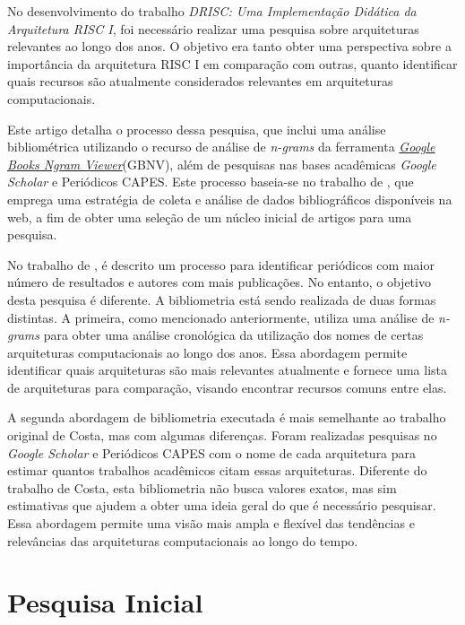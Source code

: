 \documentclass[
	article,			%
	11pt,				%
	oneside,			%
	a4paper,			%
	english,			%
	brazil,				%
	sumario=tradicional
	]{abntex2}
\begin{document}
No desenvolvimento do trabalho \textit{DRISC: Uma Implementação Didática da Arquitetura RISC I}, foi necessário realizar uma pesquisa sobre arquiteturas relevantes ao longo dos anos. O objetivo era tanto obter uma perspectiva sobre a importância da arquitetura RISC I em comparação com outras, quanto identificar quais recursos são atualmente considerados relevantes em arquiteturas computacionais.

Este artigo detalha o processo dessa pesquisa, que inclui uma análise bibliométrica utilizando o recurso de análise de \textit{n-grams}\cite{michel_quantitative_2011} da ferramenta \href{https://books.google.com/ngrams}{\textit{Google Books Ngram Viewer}}(GBNV), além de pesquisas nas bases acadêmicas \textit{Google Scholar} e Periódicos CAPES. Este processo baseia-se no trabalho de , que emprega uma estratégia de coleta e análise de dados bibliográficos disponíveis na web, a fim de obter uma seleção de um núcleo inicial de artigos para uma pesquisa.

No trabalho de , é descrito um processo para identificar periódicos com maior número de resultados e autores com mais publicações. No entanto, o objetivo desta pesquisa é diferente. A bibliometria está sendo realizada de duas formas distintas. A primeira, como mencionado anteriormente, utiliza uma análise de \textit{n-grams} para obter uma análise cronológica da utilização dos nomes de certas arquiteturas computacionais ao longo dos anos. Essa abordagem permite identificar quais arquiteturas são mais relevantes atualmente e fornece uma lista de arquiteturas para comparação, visando encontrar recursos comuns entre elas.

A segunda abordagem de bibliometria executada é mais semelhante ao trabalho original de Costa, mas com algumas diferenças. Foram realizadas pesquisas no \textit{Google Scholar} e Periódicos CAPES com o nome de cada arquitetura para estimar quantos trabalhos acadêmicos citam essas arquiteturas. Diferente do trabalho de Costa, esta bibliometria não busca valores exatos, mas sim estimativas que ajudem a obter uma ideia geral do que é necessário pesquisar. Essa abordagem permite uma visão mais ampla e flexível das tendências e relevâncias das arquiteturas computacionais ao longo do tempo.

\section{Pesquisa Inicial}
\end{document}

